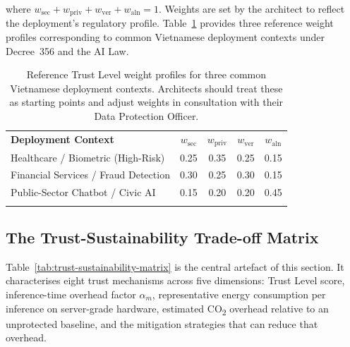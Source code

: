 where $w_{\mathrm{sec}} + w_{\mathrm{priv}} + w_{\mathrm{ver}}
+ w_{\mathrm{aln}} = 1$.
Weights are set by the architect to reflect the deployment's
regulatory profile.
Table~\ref{tab:weight-profiles} provides three reference weight
profiles corresponding to common Vietnamese deployment contexts
under Decree~356 and the AI Law.

\begin{table}[ht]
\centering
\caption{Reference Trust Level weight profiles for three common
  Vietnamese deployment contexts.
  Architects should treat these as starting points and adjust
  weights in consultation with their Data Protection Officer.}
\label{tab:weight-profiles}
\begin{tabular}{p{5cm}cccc}
\hline\noalign{\smallskip}
\textbf{Deployment Context}
  & $w_{\mathrm{sec}}$
  & $w_{\mathrm{priv}}$
  & $w_{\mathrm{ver}}$
  & $w_{\mathrm{aln}}$ \\
\noalign{\smallskip}\svhline\noalign{\smallskip}
Healthcare / Biometric (High-Risk)
  & 0.25 & 0.35 & 0.25 & 0.15 \\
Financial Services / Fraud Detection
  & 0.30 & 0.25 & 0.30 & 0.15 \\
Public-Sector Chatbot / Civic AI
  & 0.15 & 0.20 & 0.20 & 0.45 \\
\noalign{\smallskip}\hline\noalign{\smallskip}
\end{tabular}
\end{table}

\subsection{The Trust-Sustainability Trade-off Matrix}
\label{sec:trust-sustainability}

Table~\ref{tab:trust-sustainability-matrix} is the central
artefact of this section.
It characterises eight trust mechanisms across five dimensions:
Trust Level score, inference-time overhead factor $\alpha_m$,
representative energy consumption per inference on server-grade
hardware, estimated CO\textsubscript{2} overhead relative to an
unprotected baseline, and the mitigation strategies that can
reduce that overhead.

